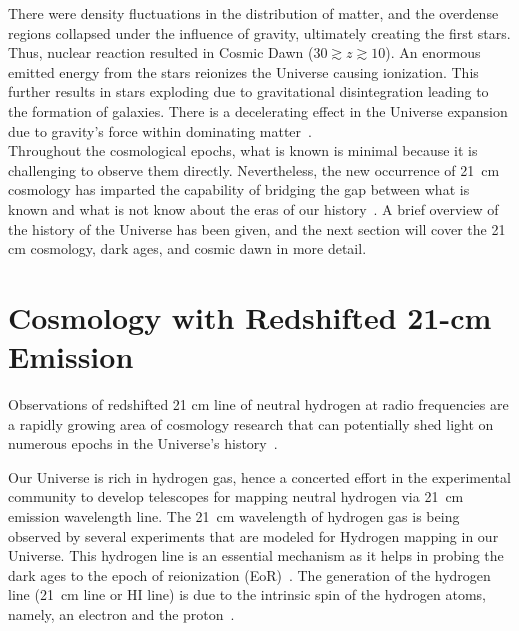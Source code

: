 	There were density fluctuations in the distribution of matter, and the overdense regions collapsed under the influence of gravity, ultimately creating the first stars. Thus, nuclear reaction resulted in Cosmic Dawn ($30\gtrsim z \gtrsim 10$). An enormous emitted energy from the stars reionizes the Universe causing ionization. This further results in stars exploding due to gravitational disintegration leading to the formation of galaxies. There is a decelerating effect in the Universe expansion due to gravity's force within dominating matter~\citep{2017arXiv170808521D, 2012AdSpR..49..433B}.\\
	
	Throughout the cosmological epochs, what is known is minimal because it is challenging to observe them directly. Nevertheless, the new occurrence of \SI{21}{cm} cosmology has imparted the capability of bridging the gap between what is known and what is not know about the eras of our history~\citep{2014ApJ...782L...9V, 2013PhRvD..87d3002L}. A brief overview of the history of the Universe has been given, and the next section will cover the 21 cm cosmology, dark ages, and cosmic dawn in more detail.
	           
	\section{Cosmology with Redshifted 21-cm Emission}
	
	
		
	Observations of redshifted 21 cm line of neutral hydrogen at radio frequencies are a rapidly growing area of cosmology research that can potentially shed light on numerous epochs in the Universe's history~\citep{2012RPPh...75h6901P}.
	
	Our Universe is rich in hydrogen gas, hence a
	concerted effort in the experimental community to develop telescopes for mapping neutral hydrogen via \SI{21}{cm} emission wavelength line. The \SI{21}{cm} wavelength of hydrogen gas is being observed by several experiments that are modeled for Hydrogen mapping in our Universe. This hydrogen line is an essential mechanism as it helps in probing the dark ages to the epoch of reionization (EoR)~\citep{2013PhRvD..87d3002L,2014ApJ...782...66P}. The generation of the hydrogen line (\SI{21}{cm} line or HI line) is due to the intrinsic spin of the hydrogen atoms, namely, an electron and the proton~\citep{book:832129}.\\
	
